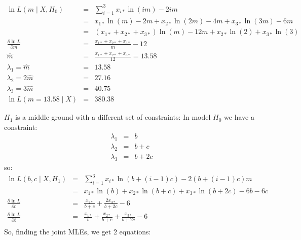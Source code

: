 \documentclass[11pt]{article}
\begin{document}
{\begin{eqnarray}
\ln L(m\mid X, H_0) & = & \sum_{i=1}^{3}x_{i\ast}\ln(i m) - 2im \\
& = & x_{1\ast}\ln(m) - 2m + x_{2\ast}\ln(2m) - 4m + x_{3\ast}\ln(3m) - 6m\\
& = & (x_{1\ast} + x_{2\ast} + x_{3\ast})\ln(m) - 12m + x_{2\ast}\ln(2) + x_{3\ast}\ln(3) \\
\frac{\partial \ln L}{\partial m} & = & \frac{x_{1\ast}+ x_{2\ast} + x_{3\ast}}{m} - 12 \\
\hat{m} &  = & \frac{x_{1\ast}+ x_{2\ast} + x_{3\ast}}{12} = 13.58\\
{\lambda_1}  = \hat{m} &= &13.58\\
{\lambda_2}  = 2\hat{m}& =& 27.16 \\
{\lambda_3}  = 3\hat{m}& =& 40.75 \\
\ln L(m=13.58\mid X) & = & 380.38
\end{eqnarray}



$H_1$ is a middle ground with a different set of constraints:
In model $H_0$ we have a constraint:
\begin{eqnarray}
{\lambda_1} & = & b \\
{\lambda_2} & = & b + c \\
{\lambda_3} & = & b + 2c 
\end{eqnarray}
so:
\begin{eqnarray}
\ln L(b, c\mid X, H_1) & = & \sum_{i=1}^{3}x_{i\ast}\ln(b + (i-1) c) - 2(b + (i-1) c)m \\
& = & x_{1\ast}\ln(b)  + x_{2\ast}\ln(b+c)  + x_{3\ast}\ln(b+2c) - 6b - 6c \\
\frac{\partial \ln L}{\partial c} & = & \frac{x_{2\ast}}{b+c} + \frac{2x_{3\ast}}{b+2c} - 6 \\
\frac{\partial \ln L}{\partial b} & = & \frac{x_{1\ast}}{b} +  \frac{x_{2\ast}}{b+c} + \frac{x_{3\ast}}{b+2c} - 6 \\
\end{eqnarray}
So, finding the joint MLEs, we get 2 equations:

}
\end{document}
